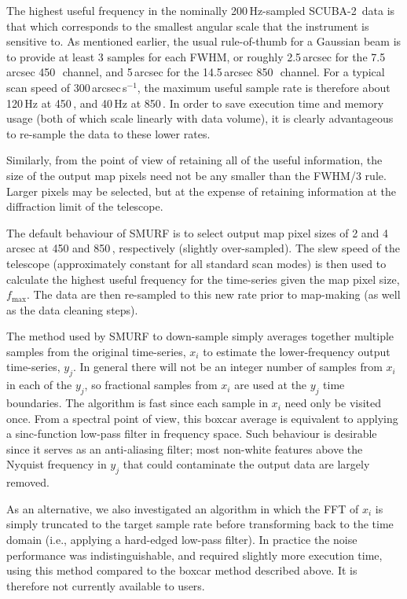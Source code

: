 \documentclass[useAMS,usenatbib,nofootinbib]{mn2e}
\newcommand{\scuba}{SCUBA-2}
\begin{document}
The highest useful frequency in the nominally 200\,Hz-sampled
\scuba\ data is that which corresponds to the smallest angular scale
that the instrument is sensitive to. As mentioned earlier, the usual
rule-of-thumb for a Gaussian beam is to provide at least 3 samples for
each FWHM, or roughly 2.5\,arcsec for the 7.5\,arcsec
450\,\micron\ channel, and 5\,arcsec for the 14.5\,arcsec
850\,\micron\ channel. For a typical scan speed of
300\,arcsec\,s$^{-1}$, the maximum useful sample rate is therefore
about 120\,Hz at 450\,\micron, and 40\,Hz at 850\,\micron. In order to
save execution time and memory usage (both of which scale linearly
with data volume), it is clearly advantageous to re-sample the data to
these lower rates.

Similarly, from the point of view of retaining all of the useful
information, the size of the output map pixels need not be any smaller
than the FWHM/3 rule. Larger pixels may be selected, but at the
expense of retaining information at the diffraction limit of the
telescope.

The default behaviour of SMURF is to select output map pixel sizes of
2 and 4\,arcsec at 450 and 850\,\micron, respectively (slightly
over-sampled). The slew speed of the telescope (approximately constant
for all standard scan modes) is then used to calculate the highest
useful frequency for the time-series given the map pixel size,
$f_\mathrm{max}$. The data are then re-sampled to this new rate prior
to map-making (as well as the data cleaning steps).

The method used by SMURF to down-sample simply averages together
multiple samples from the original time-series, $x_i$ to estimate the
lower-frequency output time-series, $y_j$. In general there will not
be an integer number of samples from $x_i$ in each of the $y_j$, so
fractional samples from $x_i$ are used at the $y_j$ time
boundaries. The algorithm is fast since each sample in $x_i$ need only
be visited once. From a spectral point of view, this boxcar average is
equivalent to applying a sinc-function low-pass filter in frequency
space. Such behaviour is desirable since it serves as an anti-aliasing
filter; most non-white features above the Nyquist frequency in $y_j$
that could contaminate the output data are largely removed.

As an alternative, we also investigated an algorithm in which the FFT
of $x_i$ is simply truncated to the target sample rate before
transforming back to the time domain (i.e., applying a hard-edged
low-pass filter). In practice the noise performance was
indistinguishable, and required slightly more execution time, using
this method compared to the boxcar method described above. It is
therefore not currently available to users.
\end{document}
